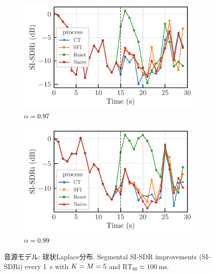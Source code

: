 \documentclass[twocolumn,9pt,dvipdfmx]{article}
\begin{document}
\begin{figure}[t]
  \begin{subfigure}[t]{\columnwidth}
    \centering
    \includegraphics{figures/plots/online/Laplace_8000_97.pdf}
    \caption{$\alpha = 0.97$}%
    \label{fig:plot:batch:laplace:97}
  \end{subfigure}%

  \begin{subfigure}[t]{\columnwidth}
    \centering
    \includegraphics{figures/plots/online/Laplace_8000_99.pdf}
    \caption{$\alpha = 0.99$}%
    \label{fig:plot:batch:laplace:99}
  \end{subfigure}%
  \caption{音源モデル: 球状Laplace分布. Segmental SI-SDR improvements (SI-SDRi) every \SI{1}{\second} with $K = M = 5$ and $\text{RT}_{60} \approx \SI{100}{\milli\second}$.}
\end{figure}
\end{document}
